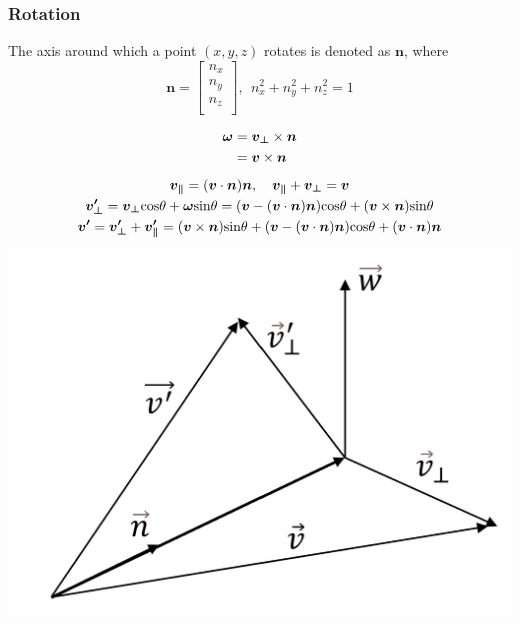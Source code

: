 \documentclass[11pt]{article}
\begin{document}
\subsubsection{Rotation}
The axis around which a point $(x,y,z)$ rotates is denoted as $\bm{n}$, where
\begin{equation}
    \bm{n} = \begin{bmatrix}
    n_{x}  \\
    n_{y} \\
    n_{z} \\
    \end{bmatrix}
    ,~~n_{x}^2 + n_{y}^2 + n_{z}^2 = 1
\end{equation}
\begin{minipage}[b]{0.65\linewidth}
\begin{equation}
\begin{aligned}
    \bm{\omega} &= \bm{v_{\perp}}\times \bm{n} \\
    &=  \bm{v} \times \bm{n} \notag
\end{aligned}
\end{equation}
\begin{gather}
    \bm{v_{\parallel}} = (\bm{v}\cdot\bm{n})\bm{n} \notag,~~~\bm{v_{\parallel}} + \bm{v_{\perp}} = \bm{v} \\
    \bm{v_{\perp}'} = \bm{v_{\perp}} \text{cos}\theta + \bm{\omega}\text{sin}\theta = (\bm{v}-(\bm{v}\cdot \bm{n})\bm{n})\text{cos}\theta + (\bm{v} \times \bm{n} )\text{sin}\theta \notag \\
    \bm{v'} = \bm{v_{\perp}'} + \bm{v_{\parallel}'} = (\bm{v} \times \bm{n})\text{sin}\theta + (\bm{v}-(\bm{v}\cdot \bm{n})\bm{n})\text{cos}\theta + (\bm{v}\cdot \bm{n})\bm{n} \notag
\end{gather}
\end{minipage}
\hfill
\begin{minipage}[b]{0.55\linewidth}
\includegraphics[height=8\baselineskip]{Auxiliary Files/Rotation Display.png}
\end{minipage}
\end{document}
